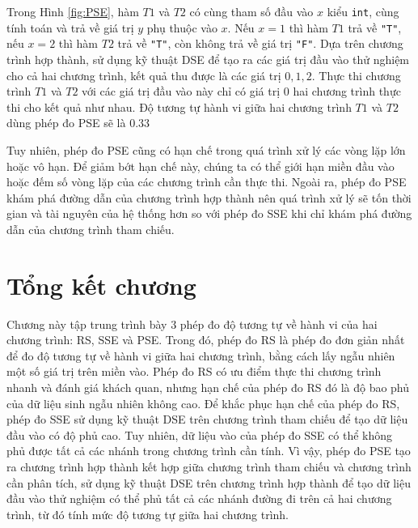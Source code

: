 Trong Hình \ref{fig:PSE}, hàm $ T1 $ và $ T2 $ có cùng tham số 
đầu vào $ x $ kiểu \texttt{int}, cùng tính toán và trả về giá trị 
$ y $ phụ thuộc vào $ x $. Nếu $ x = 1$ thì hàm $ T1 $ trả về 
\texttt{"T"}, nếu $ x = 2$ thì hàm $ T2 $ trả về \texttt{"T"}, 
còn không trả về giá trị \texttt{"F"}. Dựa trên chương trình hợp 
thành, sử dụng kỹ thuật DSE để tạo ra các giá trị đầu vào thử nghiệm 
cho cả hai chương trình, kết quả thu được là các giá trị $ 0, 1, 2 $. 
Thực thi chương trình $ T1 $ và $ T2 $ với các giá trị đầu vào này chỉ 
có giá trị $ 0 $ hai chương trình thực thi cho kết quả như nhau. Độ tương 
tự hành vi giữa hai chương trình $ T1 $ và $ T2 $ dùng phép đo PSE sẽ là $ 0.33 $
 

 Tuy nhiên, phép đo PSE cũng có hạn chế trong quá trình xử lý các 
 vòng lặp lớn hoặc vô hạn. Để giảm bớt hạn chế này, chúng ta có thể 
 giới hạn miền đầu vào hoặc đếm số vòng lặp của các chương trình 
 cần thực thi. Ngoài ra, phép đo PSE khám phá đường dẫn của chương 
 trình hợp thành nên quá trình xử lý sẽ tốn thời gian và tài nguyên 
 của hệ thống hơn so với phép đo SSE khi chỉ khám phá đường dẫn của 
 chương trình tham chiếu.

 \section*{Tổng kết chương}
Chương này tập trung trình bày $3$ phép đo độ tương tự về hành vi 
của hai chương trình: RS, SSE và PSE. Trong đó, phép đo RS là phép đo 
đơn giản nhất để đo độ tương tự về hành vi giữa hai chương trình, bằng
cách lấy ngẫu nhiên một số giá trị trên miền vào. Phép đo RS có ưu điểm 
thực thi chương trình nhanh và đánh giá khách quan, nhưng hạn chế của 
phép đo RS đó là độ bao phủ của dữ liệu sinh ngẫu nhiên không cao. 
Để khắc phục hạn chế của phép đo RS, phép đo SSE sử dụng kỹ thuật 
DSE trên chương trình tham chiếu để tạo dữ liệu đầu vào có độ phủ
cao. Tuy nhiên, dữ liệu vào của phép đo SSE có thể 
không phủ được tất cả các nhánh trong chương trình cần tính. 
Vì vậy, phép đo PSE tạo ra chương trình hợp thành kết hợp giữa 
chương trình tham chiếu và chương trình cần phân tích, sử dụng kỹ 
thuật DSE trên chương trình hợp thành để tạo dữ liệu đầu vào thử 
nghiệm có thể phủ tất cả các nhánh đường đi trên cả hai chương trình, 
từ đó tính mức độ tương tự giữa hai chương trình. 




  
